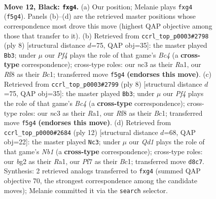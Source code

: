\documentclass[11pt]{article}
\begin{document}
\clearpage

\begin{figure}[p]\centering
\begin{subfigure}{0.46\textwidth}\centering
\resizebox{\linewidth}{!}{%
\newchessgame
\chessboard[
  setfen={r1bqnr1k/pp1pppbp/8/2p2p2/2P3P1/2N5/PP1P1PBP/R1BQNRK1 b - - 0 12},
  showmover=false,
  pgfstyle=straightmove, color=movearrow, markmove={f5-g4}
]}
\caption{}
\end{subfigure}\hfill
\begin{subfigure}{0.46\textwidth}\centering
\resizebox{\linewidth}{!}{%
\newchessgame
\chessboard[
  setfen={rnbqkb1r/ppp1pppp/1n6/8/2B5/2N5/PPPP1PPP/R1BQK1NR w KQkq - 2 5},
  showmover=false,
  pgfstyle=straightmove, color=movearrow, markmove={c4-b3}
]}
\caption{}
\end{subfigure}
\\[4pt]
\begin{subfigure}{0.46\textwidth}\centering
\resizebox{\linewidth}{!}{%
\newchessgame
\chessboard[
  setfen={rnbqkb1r/ppp1pppp/1n6/8/2B5/2N5/PPPP1PPP/R1BQK1NR w KQkq - 2 5},
  showmover=false,
  pgfstyle=straightmove, color=movearrow, markmove={c4-b3}
]}
\caption{}
\end{subfigure}\hfill
\begin{subfigure}{0.46\textwidth}\centering
\resizebox{\linewidth}{!}{%
\newchessgame
\chessboard[
  setfen={rn1qkb1r/ppp1pppp/1n6/7b/2PP4/5N1P/PP3PP1/RNBQKB1R w KQkq - 1 7},
  showmover=false,
  pgfstyle=straightmove, color=movearrow, markmove={b1-c3}
]}
\caption{}
\end{subfigure}
\caption{\textbf{Move 12, Black: \texttt{fxg4}.} (a) Our position; Melanie plays \texttt{fxg4} (\texttt{f5g4}). Panels (b)--(d) are the retrieved master positions whose correspondence most drove this move (highest QAP objective among those that transfer to it). (b) Retrieved from \texttt{ccrl\_top\_p0003\#2798} (ply 8) [structural distance $d$=75, QAP obj=35]: the master played \texttt{Bb3}; under $\mu$ our \emph{Pf4} plays the role of that game's \emph{Bc4} (a \textbf{cross-type} correspondence); cross-type roles: our \emph{n}c3 as their \emph{R}a1, our \emph{R}f8 as their \emph{B}c1; transferred move \texttt{f5g4} \textbf{(endorses this move)}. (c) Retrieved from \texttt{ccrl\_top\_p0003\#2799} (ply 8) [structural distance $d$=75, QAP obj=35]: the master played \texttt{Bb3}; under $\mu$ our \emph{Pf4} plays the role of that game's \emph{Bc4} (a \textbf{cross-type} correspondence); cross-type roles: our \emph{n}c3 as their \emph{R}a1, our \emph{R}f8 as their \emph{B}c1; transferred move \texttt{f5g4} \textbf{(endorses this move)}. (d) Retrieved from \texttt{ccrl\_top\_p0000\#2684} (ply 12) [structural distance $d$=68, QAP obj=22]: the master played \texttt{Nc3}; under $\mu$ our \emph{Qd1} plays the role of that game's \emph{Nb1} (a \textbf{cross-type} correspondence); cross-type roles: our \emph{b}g2 as their \emph{R}a1, our \emph{P}f7 as their \emph{B}c1; transferred move \texttt{d8c7}. Synthesis: 2 retrieved analogs transferred to \texttt{fxg4} (summed QAP objective 70, the strongest correspondence among the candidate moves); Melanie committed it via the \texttt{search} selector.}
\label{fig:thought-m23}
\end{figure}
\end{document}
